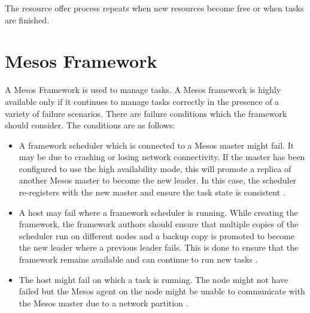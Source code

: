 \documentclass[9pt,twocolumn,twoside]{../../styles/osajnl}
\begin{document}
The resource offer process repeats when new resources become free or
when tasks are finished.

\section{Mesos Framework}
A Mesos Framework is used to manage tasks. A Mesos framework is highly
available only if it continues to manage tasks correctly in the
presence of a variety of failure scenarios. There are failure
conditions which the framework should consider. The conditions are as
follows:

\begin{itemize}
\item A framework scheduler which is connected to a Mesos master might
  fail. It may be due to crashing or losing network connectivity. If
  the master has been configured to use the high availability mode,
  this will promote a replica of another Mesos master to become the
  new leader. In this case, the scheduler re-registers with the new
  master and ensure the task state is consistent
  \cite{www-mesos-frmwrk}.
\item A host may fail where a framework scheduler is running. While
  creating the framework, the framework authors should ensure that
  multiple copies of the scheduler run on different nodes and a backup
  copy is promoted to become the new leader where a previous leader
  fails. This is done to ensure that the framework remains available
  and can continue to run new tasks \cite{www-mesos-frmwrk}.
\item The host might fail on which a task is running. The node might
  not have failed but the Mesos agent on the node might be unable to
  communicate with the Mesos master due to a network partition
  \cite{www-mesos-frmwrk}.
\end{itemize}
\end{document}
